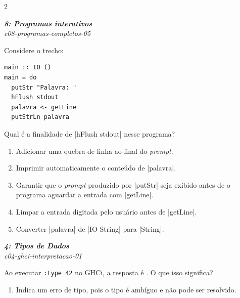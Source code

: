 \documentclass[a4paper,10pt,brazil]{article}
\begin{document}
\begin{multicols}{2}
\begin{flushright}
  \footnotesize
  \textit{\textbf{8: Programas interativos}}\\
  \textit{c08-programas-completos-05}\\

\end{flushright}
Considere o trecho:

\begin{verbatim}
main :: IO ()
main = do
  putStr "Palavra: "
  hFlush stdout
  palavra <- getLine
  putStrLn palavra
\end{verbatim}

Qual é a finalidade de \haskellinline|hFlush stdout| nesse programa?

\begin{enumerate}
  \item Adicionar uma quebra de linha ao final do \emph{prompt}.

  \item Imprimir automaticamente o conteúdo de \haskellinline|palavra|.

  \item Garantir que o \emph{prompt} produzido por \haskellinline|putStr| seja exibido antes de o programa aguardar a entrada com \haskellinline|getLine|.

  \item Limpar a entrada digitada pelo usuário antes de \haskellinline|getLine|.

  \item Converter \haskellinline|palavra| de \haskellinline|IO String| para \haskellinline|String|.


\end{enumerate}

\begin{flushright}
  \footnotesize
  \textit{\textbf{4: Tipos de Dados}}\\
  \textit{c04-ghci-interpretacao-01}\\

\end{flushright}
Ao executar \texttt{:type 42} no GHCi, a resposta é . O que isso significa?

\begin{enumerate}
  \item Indica um erro de tipo, pois o tipo é ambíguo e não pode ser resolvido.


\end{enumerate}
\end{multicols}
\end{document}
